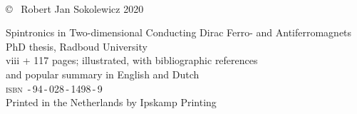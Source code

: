 \frenchspacing
\raggedbottom

\thispagestyle{empty}
\vspace*{4em}
\begin{center}
\huge{}\\
\end{center}
\newpage

\thispagestyle{empty}
\null
\vfill

\setlength{\marginparwidth}{2em}
\setlength{\marginparsep}{0.75em}

\noindent \copyright~ Robert Jan Sokolewicz 2020


\noindent Spintronics in Two-dimensional Conducting Dirac Ferro- and Antiferromagnets\\
PhD thesis, Radboud University\\
viii + 117 pages; illustrated, with bibliographic references \\ and popular summary in English and Dutch\\[2ex]
{\scshape isbn} \,-\,94\,-\,028\,-\,1498\,-\,9\\[2ex]
Printed in the Netherlands by Ipskamp Printing\\[2ex]


